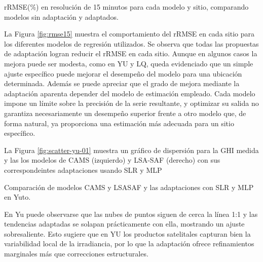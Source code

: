 \documentclass[letterpaper,12pt, twoside]{report}
\providecommand{\DIFdeltex}[1]{{\protect\color{red} \scriptsize #1}} %
\providecommand{\DIFdelFL}[1]{\DIFdel{#1}} %
\providecommand{\DIFdel}[1]{\texorpdfstring{\DIFdeltex{#1}}{}} %
\begin{document}
{%
\DIFdelFL{rRMSE(\%) en resolución de 15 minutos para cada modelo y sitio, comparando modelos sin adaptación y adaptados.}}

\DIFdel{La Figura \ref{fig:rmse15} muestra el comportamiento del rRMSE en cada sitio para los diferentes modelos de regresión utilizados. Se observa que todas las propuestas de adaptación logran reducir el rRMSE en cada sitio. Aunque en algunos casos la mejora puede ser modesta, como en YU y LQ, queda evidenciado que un simple ajuste específico puede mejorar el desempeño del modelo para una ubicación determinada. Además se puede apreciar que el grado de mejora mediante la adaptación aparenta depender del modelo de estimación empleado. Cada modelo impone un límite sobre la precisión de la serie resultante, y optimizar su salida no garantiza necesariamente un desempeño superior frente a otro modelo que, de forma natural, ya proporciona una estimación más adecuada para un sitio específico.}%

\DIFdel{La Figura \ref{fig:scatter-yu-01} muestra un gráfico de dispersión para la GHI medida y las los modelos de CAMS (izquierdo) y LSA-SAF (derecho) con sus correspondeintes adaptaciones usando SLR y MLP
}%

{%
\DIFdelFL{Comparación de modelos CAMS y LSASAF y las adaptaciones con SLR y MLP en Yuto.}}

\DIFdel{En Yu puede observarse que las nubes de puntos siguen de cerca la línea 1:1 y las tendencias adaptadas se solapan prácticamente con ella, mostrando un ajuste sobresaliente. Esto sugiere que en YU los productos satelitales capturan bien la variabilidad local de la irradiancia, por lo que la adaptación ofrece refinamientos marginales más que correcciones estructurales. 
}%
\end{document}
